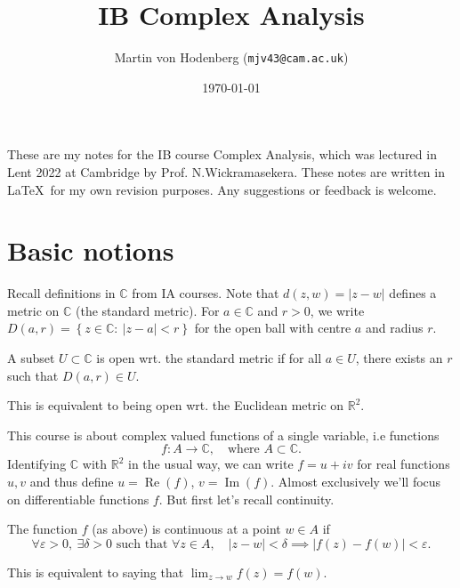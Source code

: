 \documentclass[a4paper]{scrartcl}
\title{IB Complex Analysis}
\author{Martin von Hodenberg (\texttt{mjv43@cam.ac.uk})}
\date{\today}
\begin{document}
\maketitle
These are my notes for the IB course Complex Analysis, which was lectured in Lent 2022 at Cambridge by Prof. N.Wickramasekera. These notes are written in \LaTeX  \ for my own revision purposes. Any suggestions or feedback is welcome.

\tableofcontents
\newpage

\section{Basic notions}
Recall definitions in $\mathbb{C}$ from IA courses. Note that $d (z,w)=|z-w|$ defines a metric on $\mathbb{C}$ (the standard metric). For $a \in \mathbb{C}$ and $r >0$, we write $D (a,r)= \left\{z \in \mathbb{C}: \ |z-a|<r \right\}$ for the open ball with centre $a$ and radius $r$. 
\begin{definition*}
     A subset $U \subset \mathbb{C}$ is open wrt. the standard metric if for all $a \in U$, there exists an $r$ such that $D (a,r) \in U$.
\end{definition*} 
\begin{remark}
     This is equivalent to being open wrt. the Euclidean metric on $\mathbb{R}^{2} $.
\end{remark}

This course is about complex valued functions of a single variable, i.e functions \[
f: A \rightarrow \mathbb{C}, \quad \text{where } A \subset \mathbb{C}
.\] 
Identifying $\mathbb{C}$ with $\mathbb{R}^2$ in the usual way, we can write $f=u+iv$ for real functions $u,v$ and thus define $u= \operatorname{Re} (f)$, $v=\operatorname{Im} (f)$. 
Almost exclusively we'll focus on differentiable functions $f$. But first let's recall continuity. 
\begin{definition*}
     The function $f$ (as above) is continuous at a point $w \in A$ if \[
     \forall \varepsilon >0, \ \exists \delta >0 \text{ such that } \forall z \in A,\quad  |z-w|<\delta \implies |f (z)- f (w)| <\varepsilon
     .\] 
\end{definition*}
\begin{remark}
     This is equivalent to saying that $\lim_{z \rightarrow w} f(z)=f (w) $. 
\end{remark}
\end{document}
